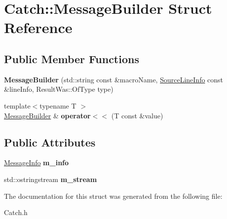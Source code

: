 \hypertarget{struct_catch_1_1_message_builder}{\section{Catch\-:\-:Message\-Builder Struct Reference}
\label{struct_catch_1_1_message_builder}
}
\subsection*{Public Member Functions}
\begin{DoxyCompactItemize}
\item 
\hypertarget{struct_catch_1_1_message_builder_ab0c6378e722680bf58852c6ee2b6e724}{{\bfseries Message\-Builder} (std\-::string const \&macro\-Name, \hyperlink{struct_catch_1_1_source_line_info}{Source\-Line\-Info} const \&line\-Info, Result\-Was\-::\-Of\-Type type)}\label{struct_catch_1_1_message_builder_ab0c6378e722680bf58852c6ee2b6e724}

\item 
\hypertarget{struct_catch_1_1_message_builder_a20fa48d069b20dddcc2d3df8abb123c1}{{\footnotesize template$<$typename T $>$ }\\\hyperlink{struct_catch_1_1_message_builder}{Message\-Builder} \& {\bfseries operator$<$$<$} (T const \&value)}\label{struct_catch_1_1_message_builder_a20fa48d069b20dddcc2d3df8abb123c1}

\end{DoxyCompactItemize}
\subsection*{Public Attributes}
\begin{DoxyCompactItemize}
\item 
\hypertarget{struct_catch_1_1_message_builder_a979f1c2b36d78f80ee275bfa5ba0209f}{\hyperlink{struct_catch_1_1_message_info}{Message\-Info} {\bfseries m\-\_\-info}}\label{struct_catch_1_1_message_builder_a979f1c2b36d78f80ee275bfa5ba0209f}

\item 
\hypertarget{struct_catch_1_1_message_builder_a6488ab0cc4ea52affc9c0612c7c5df6b}{std\-::ostringstream {\bfseries m\-\_\-stream}}\label{struct_catch_1_1_message_builder_a6488ab0cc4ea52affc9c0612c7c5df6b}

\end{DoxyCompactItemize}


The documentation for this struct was generated from the following file\-:\begin{DoxyCompactItemize}
\item 
Catch.\-h\end{DoxyCompactItemize}
